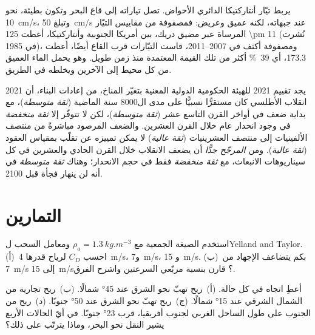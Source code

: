 يربط تيّار أنتاركتيكا الدائري الأحواض. تصل تياراته إلى قاع البحر وتكون بطيئة، نحو \qty{10}{cm/s}، وتبلغ \qty{50}{cm/s} عند جبهاته، لكنه عميق وعريض: فمصفوفة من مقاييس التيّار المرساة عبر مضيق دريك، بين أمريكا الجنوبية وأنتاركتيكا، أعطت \qty[uncertainty-mode=separate]{125 \pm
11}{\sverdrup} (نُشرت في 1985)، ومصفوفة أكثف في 2007--2011، قاست التيّارات قرب القاع أيضًا، أعطت \qty{173.3}{\sverdrup}، أي \qty{39}{\percent} أكثر من تلك القيمة المعتمدة منذ زمن طويل. وهو يحمل الماء العميق من كل محيط إلى الآخرين ويخلطه في الطريق.

\begin{dated}{2021}
يجد تقييم 2021 للهيئة الحكومية الدولية المعنية بتغيّر المناخ، من إعادات البناء، أن انقلاب الأطلسي كان مستقرًّا نسبيًّا على مدى ال\num{8000} سنة الماضية (\emph{ثقة متوسطة})، مع بداية ضعف في أواخر القرن التاسع عشر (\emph{ثقة متوسطة})، لكن لا تتوفّر إلا \emph{ثقة منخفضة} في وجود انحدار عام خلال القرن العشرين. والضعف المرصود مباشرةً من منتصف الألفينيات إلى منتصف العشرينيات (\emph{ثقة عالية}) لا يمكن تمييزه عن تقلّب بمقياس العقود (\emph{ثقة عالية}). ومن \emph{المرجّح جدًّا} أن يضعف الانقلاب خلال القرن الحادي والعشرين في كل سيناريوهات الانبعاث، مع \emph{ثقة منخفضة} فقط في حجم الانحدار؛ وهناك \emph{ثقة متوسطة} في أنه لن ينهار فجأة قبل 2100.
\end{dated}

\section{التمارين}

\begin{exercise}[$\star$]\label{exo:b1:ocean-circulation:1}
استخدم الصيغة الجمعية مع $\rho_a = \qty{1.3}{kg.m^{-3}}$ ومعامل السحب لYelland and Taylor. (أ)~احسب $C_D$  لرياح قدرها \qty{4}{m/s}، و\qty{7}{m/s}، و
\qty{15}{m/s}. (ب)~بكم يتضاعف الإجهاد من \qty{7}{m/s} إلى \qty{15}{m/s}؟ قارن بنسبة مربّعي السرعتين واشرح الفرق.
\end{exercise}

\begin{exercise}[$\star$]\label{exo:b1:ocean-circulation:2}
أعطِ اتجاه  في كل حالة. (أ)~ريح تهبّ نحو الشرق عند \ang{45} شمالًا. (ب)~ريح تجارية من الشمال الشرقي عند \ang{15} شمالًا. (ج)~ريح تهبّ نحو الشرق عند \ang{50} جنوبًا. (د)~ريح من الجنوب على طول الساحل الغربي لجنوب أفريقيا، قرب \ang{23} جنوبًا. في أيّ الحالات الأربع يشير النقل نحو البحر، وماذا يترتّب على ذلك؟
\end{exercise}

